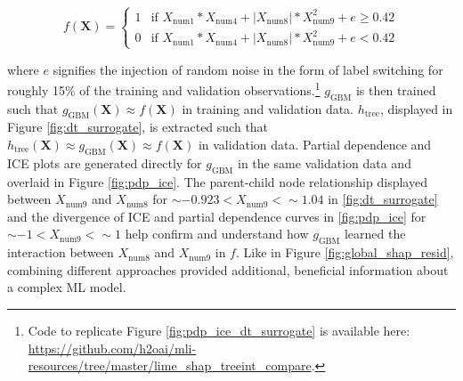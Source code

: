 \documentclass[fleqn]{article}
\newcommand{\twopartdef}[4]
{
	\left\{
		\begin{array}{ll}
			#1 & \mbox{if } #2 \\
			#3 & \mbox{if } #4
		\end{array}
	\right.
}
\begin{document}
\begin{equation}
\label{eq:f}
f(\mathbf{X}) = \twopartdef {1} {X_{\text{num}1} * X_{\text{num}4} + |X_{\text{num}8}| * X_{\text{num}9}^2 + e \geq 0.42} {0} {X_{\text{num}1} * X_{\text{num}4} + |X_{\text{num}8}| * X_{\text{num}9}^2 + e < 0.42}
\end{equation}

\noindent where $e$ signifies the injection of random noise in the form of label switching for roughly 15\% of the training and validation observations.\footnote{Code to replicate Figure \ref{fig:pdp_ice_dt_surrogate} is available here: \url{https://github.com/h2oai/mli-resources/tree/master/lime_shap_treeint_compare}.} $g_{\text{GBM}}$ is then trained such that $g_{\text{GBM}}(\mathbf{X}) \approx f(\mathbf{X})$ in training and validation data. $h_{\text{tree}}$, displayed in Figure \ref{fig:dt_surrogate}, is extracted such that $h_{\text{tree}}(\mathbf{X}) \approx g_{\text{GBM}}(\mathbf{X}) \approx f(\mathbf{X})$ in validation data. Partial dependence and ICE plots are generated directly for $g_{\text{GBM}}$ in the same validation data and overlaid in Figure \ref{fig:pdp_ice}. The parent-child node relationship displayed between $X_{\text{num9}}$ and $X_{\text{num8}}$ for $\sim -0.923 < X_{\text{num9}} <  \sim 1.04$ in \ref{fig:dt_surrogate} and the divergence of ICE and partial dependence curves in \ref{fig:pdp_ice} for $\sim -1 < X_{\text{num9}} <  \sim 1$ help confirm and understand how $g_{\text{GBM}}$ learned the interaction between $X_{\text{num}8}$ and $X_{\text{num}9}$ in $f$. Like in Figure \ref{fig:global_shap_resid}, combining different approaches provided additional, beneficial information about a complex ML model.\\ 
\end{document}
